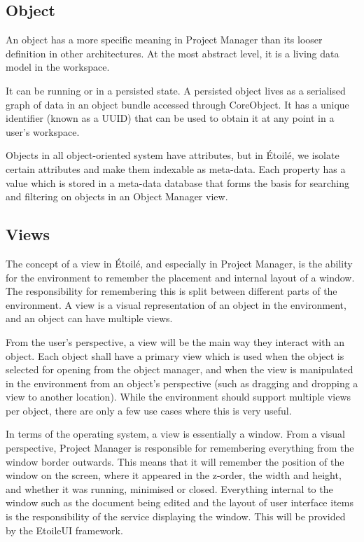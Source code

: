 \documentclass[11pt]{report}
\newcommand{\etoile}{\'Etoil\'e\xspace}
\newcommand{\proman}{Project Manager\xspace}
\begin{document}
\subsection{Object}
An object has a more specific meaning in \proman than its looser definition in other architectures. At the most abstract level, it is a living data model in the workspace.

It can be running or in a persisted state. A persisted object lives as a serialised graph of data in an object bundle accessed through CoreObject. It has a unique identifier (known as a UUID) that can be used to obtain it at any point in a user's workspace.

Objects in all object-oriented system have attributes, but in \etoile, we isolate certain attributes and make them indexable as meta-data. Each property has a value which is stored in a meta-data database that forms the basis for searching and filtering on objects in an Object Manager view.

\subsection{Views}
The concept of a view in \etoile, and especially in Project Manager, is the ability for the environment to remember the placement and internal layout of a window. The responsibility for remembering this is split between different parts of the environment. A view is a visual representation of an object in the environment, and an object can have multiple views.

From the user's perspective, a view will be the main way they interact with an object. Each object shall have a primary view which is used when the object is selected for opening from the object manager, and when the view is manipulated in the environment from an object's perspective (such as dragging and dropping a view to another location). While the environment should support multiple views per object, there are only a few use cases where this is very useful.

In terms of the operating system, a view is essentially a window. From a visual perspective, \proman is responsible for remembering everything from the window border outwards. This means that it will remember the position of the window on the screen, where it appeared in the z-order, the width and height, and whether it was running, minimised or closed. Everything internal to the window such as the document being edited and the layout of user interface items is the responsibility of the service displaying the window. This will be provided by the EtoileUI framework.
\end{document}
